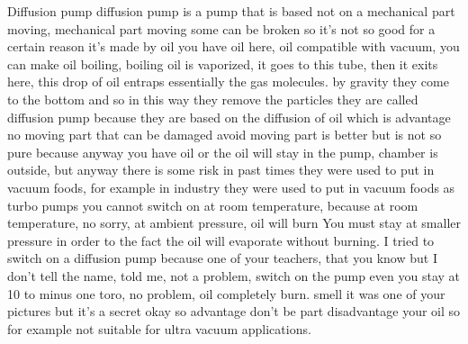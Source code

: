 Diffusion pump diffusion pump is a pump that is based not on a mechanical part moving, mechanical part moving some can be broken so it's not so good for a certain reason it's made by oil you have oil here, oil compatible with vacuum, you can make oil boiling, boiling oil is vaporized, it goes to this tube, then it exits here, this drop of oil entraps essentially the gas molecules. by gravity they come to the bottom and so in this way they remove the particles they are called diffusion pump because they are based on the diffusion of oil which is advantage no moving part that can be damaged avoid moving part is better but is not so pure because anyway you have oil or the oil will stay in the pump, chamber is outside, but anyway there is some risk in past times they were used to put in vacuum foods, for example in industry they were used to put in vacuum foods as turbo pumps you cannot switch on at room temperature, because at room temperature, no sorry, at ambient pressure, oil will burn You must stay at smaller pressure in order to the fact the oil will evaporate without burning. I tried to switch on a diffusion pump because one of your teachers, that you know but I don't tell the name, told me, not a problem, switch on the pump even you stay at 10 to minus one toro, no problem, oil completely burn. smell it was one of your pictures but it's a secret okay so advantage don't be part disadvantage your oil so for example not suitable for ultra vacuum applications.
